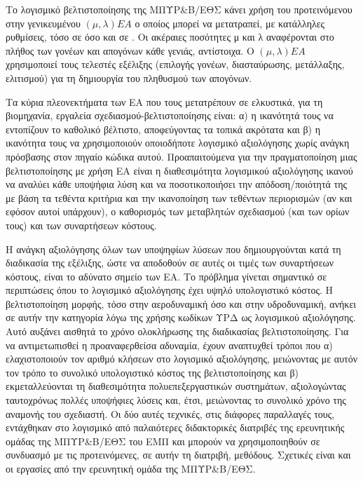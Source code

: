 Το λογισμικό βελτιστοποίησης  της ΜΠΥΡ\&Β/ΕΘΣ κάνει χρήση του προτεινόμενου στην \cite{phd_Giotis} γενικευμένου $(\mu,\lambda)EA$ ο οποίος μπορεί να μετατραπεί, με κατάλληλες ρυθμίσεις, τόσο σε  όσο και σε . Οι ακέραιες ποσότητες μ και λ αναφέρονται στο πλήθος των γονέων και απογόνων κάθε γενιάς, αντίστοιχα. Ο $(\mu,\lambda)EA$ χρησιμοποιεί τους τελεστές εξέλιξης (επιλογής γονέων, διασταύρωσης, μετάλλαξης, ελιτισμού) για τη δημιουργία του πληθυσμού των απογόνων.

Τα κύρια πλεονεκτήματα των ΕΑ που τους μετατρέπουν σε ελκυστικά, για τη βιομηχανία, εργαλεία σχεδιασμού-βελτιστοποίησης είναι: α) η ικανότητά τους να εντοπίζουν το καθολικό βέλτιστο, αποφεύγοντας τα τοπικά ακρότατα και β) η ικανότητα τους να χρησιμοποιούν οποιοδήποτε λογισμικό αξιολόγησης χωρίς ανάγκη πρόσβασης στον πηγαίο κώδικα αυτού. Προαπαιτούμενα για την πραγματοποίηση μιας βελτιστοποίησης με χρήση ΕΑ είναι η διαθεσιμότητα λογισμικού αξιολόγησης ικανού να αναλύει κάθε υποψήφια λύση και να ποσοτικοποιήσει την απόδοση/ποιότητά της με βάση τα τεθέντα κριτήρια και την ικανοποίηση των τεθέντων περιορισμών (αν και εφόσον αυτοί υπάρχουν), ο καθορισμός των μεταβλητών σχεδιασμού (και των ορίων τους) και των συναρτήσεων κόστους. 

Η ανάγκη αξιολόγησης όλων των υποψηφίων λύσεων που δημιουργούνται κατά τη διαδικασία της εξέλιξης, ώστε να αποδοθούν σε αυτές οι τιμές των συναρτήσεων κόστους, είναι το αδύνατο σημείο των ΕΑ. Το πρόβλημα γίνεται σημαντικό σε περιπτώσεις όπου το λογισμικό αξιολόγησης έχει υψηλό υπολογιστικό κόστος. Η βελτιστοποίηση μορφής, τόσο στην αεροδυναμική όσο και στην υδροδυναμική, ανήκει σε αυτήν την κατηγορία λόγω της χρήσης κωδίκων ΥΡΔ ως λογισμικού αξιολόγησης. Αυτό αυξάνει αισθητά το χρόνο ολοκλήρωσης της διαδικασίας βελτιστοποίησης. Για να αντιμετωπισθεί η προαναφερθείσα αδυναμία, έχουν αναπτυχθεί τρόποι που α) ελαχιστοποιούν τον αριθμό κλήσεων στο λογισμικό αξιολόγησης, μειώνοντας με αυτόν τον τρόπο το συνολικό υπολογιστικό κόστος της βελτιστοποίησης και β) εκμεταλλεύονται τη διαθεσιμότητα πολυεπεξεργαστικών συστημάτων, αξιολογώντας ταυτοχρόνως πολλές υποψήφιες λύσεις και, έτσι, μειώνοντας το συνολικό χρόνο της αναμονής του σχεδιαστή. Οι δύο αυτές τεχνικές, στις διάφορες παραλλαγές τους, εντάχθηκαν στο λογισμικό  από παλαιότερες διδακτορικές διατριβές της ερευνητικής ομάδας της ΜΠΥΡ\&Β/ΕΘΣ του ΕΜΠ \cite{phd_Giotis,phd_Karakasis,phd_Kampolis,phd_Vera} και μπορούν να χρησιμοποιηθούν σε συνδυασμό με τις προτεινόμενες, σε αυτήν τη διατριβή, μεθόδους. Σχετικές είναι και οι εργασίες \citep{LTT_2_026,LTT_2_045,LTT_2_031,LTT_2_018,LTT_2_020, LTT_2_023, LTT_2_027,LTT_2_029,LTT_2_031, LTT_3_092, LTT_2_053,LTT_2_043} από την ερευνητική ομάδα της ΜΠΥΡ\&Β/ΕΘΣ.               



